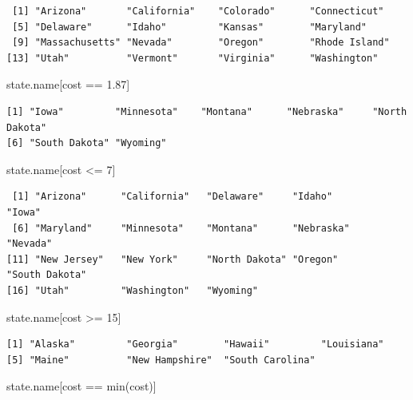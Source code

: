 \documentclass[
  letterpaper,
  DIV=11,
  numbers=noendperiod]{scrreprt}
\newenvironment{Shaded}{\begin{snugshade}}{\end{snugshade}}
\newcommand{\DecValTok}[1]{\textcolor[rgb]{0.68,0.00,0.00}{#1}}
\newcommand{\FloatTok}[1]{\textcolor[rgb]{0.68,0.00,0.00}{#1}}
\newcommand{\FunctionTok}[1]{\textcolor[rgb]{0.28,0.35,0.67}{#1}}
\newcommand{\NormalTok}[1]{\textcolor[rgb]{0.00,0.23,0.31}{#1}}
\newcommand{\SpecialCharTok}[1]{\textcolor[rgb]{0.37,0.37,0.37}{#1}}
\begin{document}
\begin{tcolorbox}
\begin{verbatim}
 [1] "Arizona"       "California"    "Colorado"      "Connecticut"  
 [5] "Delaware"      "Idaho"         "Kansas"        "Maryland"     
 [9] "Massachusetts" "Nevada"        "Oregon"        "Rhode Island" 
[13] "Utah"          "Vermont"       "Virginia"      "Washington"   
\end{verbatim}

\begin{Shaded}
\begin{Highlighting}[]
\NormalTok{state.name[cost }\SpecialCharTok{==} \FloatTok{1.87}\NormalTok{]}
\end{Highlighting}
\end{Shaded}

\begin{verbatim}
[1] "Iowa"         "Minnesota"    "Montana"      "Nebraska"     "North Dakota"
[6] "South Dakota" "Wyoming"     
\end{verbatim}

\begin{Shaded}
\begin{Highlighting}[]
\NormalTok{state.name[cost }\SpecialCharTok{\textless{}=} \DecValTok{7}\NormalTok{]}
\end{Highlighting}
\end{Shaded}

\begin{verbatim}
 [1] "Arizona"      "California"   "Delaware"     "Idaho"        "Iowa"        
 [6] "Maryland"     "Minnesota"    "Montana"      "Nebraska"     "Nevada"      
[11] "New Jersey"   "New York"     "North Dakota" "Oregon"       "South Dakota"
[16] "Utah"         "Washington"   "Wyoming"     
\end{verbatim}

\begin{Shaded}
\begin{Highlighting}[]
\NormalTok{state.name[cost }\SpecialCharTok{\textgreater{}=} \DecValTok{15}\NormalTok{]}
\end{Highlighting}
\end{Shaded}

\begin{verbatim}
[1] "Alaska"         "Georgia"        "Hawaii"         "Louisiana"     
[5] "Maine"          "New Hampshire"  "South Carolina"
\end{verbatim}

\begin{Shaded}
\begin{Highlighting}[]
\NormalTok{state.name[cost }\SpecialCharTok{==} \FunctionTok{min}\NormalTok{(cost)]}
\end{Highlighting}
\end{Shaded}


\end{tcolorbox}
\end{document}
